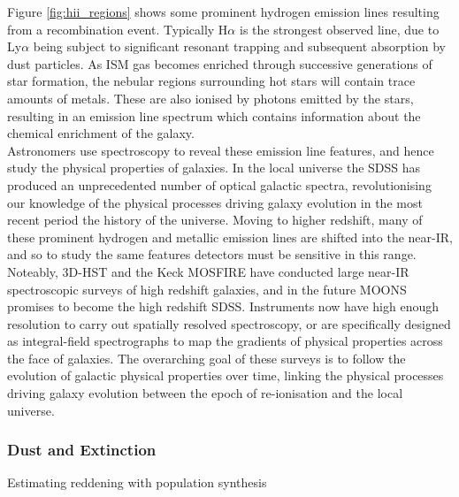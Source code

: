 \documentclass{literature}
\begin{document}
Figure \ref{fig:hii_regions} shows some prominent hydrogen emission lines resulting from a recombination event. Typically H$\alpha$ is the strongest observed line, due to Ly$\alpha$ being subject to significant resonant trapping and subsequent absorption by dust particles. As ISM gas becomes enriched through successive generations of star formation, the nebular regions surrounding hot stars will contain trace amounts of metals. These are also ionised by photons emitted by the stars, resulting in an emission line spectrum which contains information about the chemical enrichment of the galaxy. \\ 
Astronomers use spectroscopy to reveal these emission line features, and hence study the physical properties of galaxies. In the local universe the SDSS \citep{Ahn2014} has produced an unprecedented number of optical galactic spectra, revolutionising our knowledge of the physical processes driving galaxy evolution in the most recent period the history of the universe. Moving to higher redshift, many of these prominent hydrogen and metallic emission lines are shifted into the near-IR, and so to study the same features detectors must be sensitive in this range. Noteably, 3D-HST \citep{Brammer2012} and the Keck MOSFIRE \citep{McLean2012} have conducted large near-IR spectroscopic surveys of high redshift galaxies, and in the future MOONS \citep{Cirasuolo2011} promises to become the high redshift SDSS. Instruments now have high enough resolution to carry out spatially resolved spectroscopy, or are specifically designed as integral-field spectrographs to map the gradients of physical properties across the face of galaxies. The overarching goal of these surveys is to follow the evolution of galactic physical properties over time, linking the physical processes driving galaxy evolution between the epoch of re-ionisation and the local universe.        

  
\subsubsection{Dust and Extinction}\label{subsec:dust}
Estimating reddening with population synthesis
\end{document}
